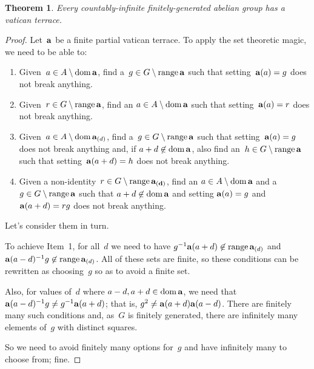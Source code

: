 \documentclass[a4paper,12pt]{article}
\newtheorem{thm}{Theorem}
\newcommand{\dom}{\mathop{\rm dom}\nolimits}
\newcommand{\range}{\mathop{\rm range}\nolimits}
\begin{document}
\begin{thm}\label{th:cifga}
Every countably-infinite finitely-generated abelian group has a vatican terrace.
\end{thm}

\begin{proof}  Let~${\bf a}$ be a finite partial vatican terrace.  To apply the set theoretic magic, we need to be able to:

\begin{enumerate}
\item Given~$a \in A \setminus \dom{{\bf a}}$, find a~$g \in G \setminus \range{{\bf a}}$ such that setting~${\bf a}(a) = g$ does not break anything.
  
\item Given~$r \in G \setminus \range{{\bf a}}$, find an $a \in A \setminus \dom{{\bf a}}$ such that setting~${\bf a}(a) = r$ does not break anything.

\item Given~$a \in A \setminus \dom{{\bf a}_{(d)}}$, find a~$g \in G \setminus \range{{\bf a}}$ such that setting~${\bf a}(a) = g$ does not break anything and, if $a + d \not\in \dom{{\bf a}}$, also find an~$h \in G \setminus \range{{\bf a}}$ such that setting~${\bf a}(a+d) = h$ does not break anything.

\item Given a non-identity~$r \in G \setminus \range{{\bf a_{(d)}}}$,  find an $a \in A \setminus \dom{{\bf a}}$ and a~$g \in G \setminus \range{{\bf a}}$ such that $a+ d \not\in \dom{{\bf a}}$ and setting ${\bf a}(a) = g$ and ${\bf a}(a+d) = rg$ does not break anything.
\end{enumerate}

Let's consider them in turn.

To achieve Item~1, for all~$d$ we need to have $g^{-1} {\bf a}(a+d) \not\in \range{ {\bf a}_{(d)} }$ and ${\bf a}(a-d)^{-1} g \not\in \range{ {\bf a}_{(d)} }$. All of these sets are finite, so these conditions can be rewritten as choosing~$g$ so as to avoid a finite set.  

Also, for values of~$d$ where $a-d, a+d \in \dom{{\bf a}}$, we need that ${\bf a}(a-d)^{-1} g \neq g^{-1} {\bf a}(a+d)$; that is, $g^2  \neq {\bf a}(a+d){\bf a}(a-d)$.  There are finitely many such conditions and, as~$G$ is finitely generated, there are infinitely many elements of~$g$ with distinct squares.  

So we need to avoid finitely many options for~$g$ and have infinitely many to choose from; fine.


\end{proof}
\end{document}
